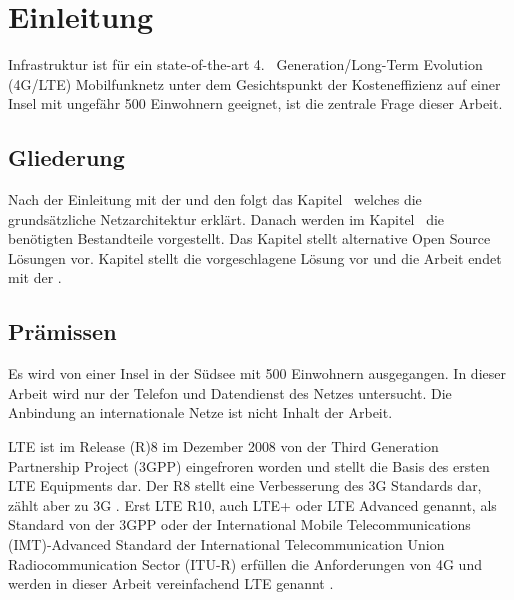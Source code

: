 
%
%
% 
% 
% 

\section{Einleitung}
\label{sec:einleitung}
 Infrastruktur ist für ein state-of-the-art  4.~ Generation/Long-Term Evolution (4G/LTE)  Mobilfunknetz unter dem Gesichtspunkt der Kosteneffizienz auf einer Insel mit ungefähr 500 Einwohnern geeignet, ist die zentrale Frage dieser Arbeit.
\subsection{Gliederung}
\label{subsec:gliederung}
Nach der Einleitung mit der  und den  folgt das Kapitel~ welches die grundsätzliche Netzarchitektur erklärt. Danach werden im Kapitel~ die benötigten Bestandteile vorgestellt. Das Kapitel  stellt alternative Open Source Lösungen vor. Kapitel  stellt die vorgeschlagene Lösung vor und die Arbeit endet mit der .
\subsection{Prämissen}
\label{subsec:praemissen}
Es wird von einer Insel in der Südsee mit 500 Einwohnern ausgegangen. In dieser Arbeit wird nur der Telefon und Datendienst des Netzes untersucht. Die Anbindung an internationale Netze ist nicht Inhalt der Arbeit.

LTE ist im Release (R)8 im Dezember 2008 von der Third Generation Partnership Project (3GPP)  eingefroren worden und stellt die Basis des ersten LTE Equipments dar. Der R8 stellt eine Verbesserung des 3G Standards dar, zählt aber zu 3G \cite[S. 32ff]{Zoi09}. Erst LTE R10, auch LTE+ oder LTE Advanced genannt, als Standard von der 3GPP oder der International Mobile Telecommunications (IMT)-Advanced Standard der International Telecommunication Union Radiocommunication Sector (ITU-R) erfüllen die Anforderungen von 4G und werden in dieser Arbeit vereinfachend LTE genannt \cite{Wan13}.

